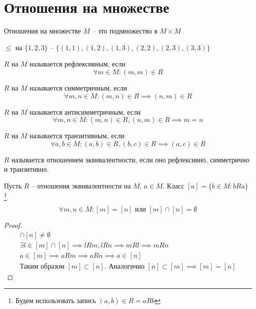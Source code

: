 \documentclass[main]{subfiles}
\begin{document}
\chapter{Отношения на множестве}
\begin{definition}
    Отношения на множестве $M$ -- это подмножество в $M\times M$
\end{definition}
\begin{example}
    $\le$ на $\{1,2,3\}$  -- $\{(1,1), (1,2), (1,3), (2,2),(2,3),(3,3)\}$
\end{example}

\begin{definition}
    $R$ на $M$ называется рефлексивным, если \[\forall m \in M: (m,m) \in R\]
\end{definition}
\begin{definition}
    $R$ на $M$ называется симметричным, если
    \[\forall m,n \in M: (m,n) \in R \implies (n,m) \in R\]
\end{definition}
\begin{definition}
    $R$ на $M$ называется антисимметричным, если
    \[\forall m,n \in M:  (m,n)\in R, (n,m) \in R \implies m = n\]
\end{definition}
\begin{definition}
    $R$ на $M$ называется транзитивным, если
    \[\forall a,b \in M: (a,b) \in R, (b,c) \in R \implies (a,c) \in R\]
\end{definition}

\begin{definition}
    $R$ называется отношением эквивалентности, если оно рефлексивно,
    симметрично и транзитивно.
\end{definition}

\begin{definition}
    Пусть $R$ -- отношения эквивалентности на $M$, $a \in M$.
    Класс $[a] = \{b\in M: bRa\}$%
    \footnote{Будем использовать запись $(a,b)\in R = aRb$}
\end{definition}

\begin{lemma}
    \[\forall m,n \in M: [m] = [n] \text{ или } [m]\cap[n] = \emptyset\]
\end{lemma}
\begin{proof}
    \begin{gather*}
        [m] \cap [n] \neq \emptyset\\
        \exists l \in [m] \cap [n] \implies lRm, lRn \implies mRl \implies mRn\\
        a\in [m] \implies aRm \implies aRn \implies a \in [n]\\
        \text{Таким образом } [m]\subset [n]. \text{ Аналогично } [n]\subset[m]
        \implies [m]=[n]
    \end{gather*}
\end{proof}
\end{document}
